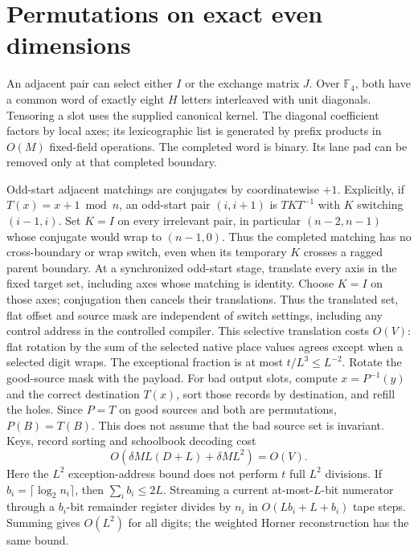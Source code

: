 \documentclass[11pt]{article}
\newcommand{\F}{\mathbb F}
\begin{document}
\section{Permutations on exact even dimensions}

An adjacent pair can select either $I$ or the exchange matrix $J$.
Over $\F_4$, both have a common word of exactly eight $H$ letters
interleaved with unit diagonals. Tensoring a slot uses the supplied
canonical kernel. The diagonal coefficient factors by local axes;
its lexicographic list is generated by prefix products in $O(M)$
fixed-field operations. The completed word is binary. Its lane pad
can be removed only at that completed boundary.

Odd-start adjacent matchings are conjugates by coordinatewise $+1$.
Explicitly, if $T(x)=x+1\bmod n$, an odd-start pair $(i,i+1)$ is
$TKT^{-1}$ with $K$ switching $(i-1,i)$. Set $K=I$ on every
irrelevant pair, in particular $(n-2,n-1)$ whose conjugate would
wrap to $(n-1,0)$. Thus the completed matching has no cross-boundary
or wrap switch, even when its temporary $K$ crosses a ragged parent
boundary.
At a synchronized odd-start stage, translate every axis in the fixed
target set, including axes whose matching is identity. Choose $K=I$
on those axes; conjugation then cancels their translations. Thus the
translated set, flat offset and source mask are independent of switch
settings, including any control address in the controlled compiler.
This selective translation costs $O(V)$: flat rotation by the sum of
the selected native place values agrees except when a selected digit
wraps. The exceptional fraction is at most $t/L^3\le L^{-2}$.
Rotate the good-source mask with the payload. For bad output slots,
compute $x=P^{-1}(y)$ and the correct destination $T(x)$, sort those
records by destination, and refill the holes. Since $P=T$ on good
sources and both are permutations, $P(B)=T(B)$. This does not assume
that the bad source set is invariant. Keys, record sorting and
schoolbook decoding cost
\[
 O(\delta ML(D+L)+\delta ML^2)=O(V).
\]
Here the $L^2$ exception-address bound does not perform $t$ full
$L^2$ divisions. If $b_i=\lceil\log_2n_i\rceil$, then
$\sum_i b_i\le2L$. Streaming a current at-most-$L$-bit numerator
through a $b_i$-bit remainder register divides by $n_i$ in
$O(Lb_i+L+b_i)$ tape steps. Summing gives $O(L^2)$ for all digits;
the weighted Horner reconstruction has the same bound.
\end{document}
